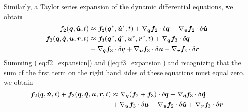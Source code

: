 \documentclass{svjour3}                     %
\begin{document}
Similarly, a Taylor series expansion of the dynamic differential equations, we
obtain
\begin{align}
  \label{eq:f2_expansion}
  \bm{f}_{2}(\bm{q}, \bm{\dot{u}}, t) &\approx
      \bm{f}_{2}(\bm{q}^*, \bm{\dot{u}}^*, t) +
      \nabla_{\bm{q}}\bm{f}_{2} \cdot \delta\bm{q}
      + \nabla_{\bm{\dot{u}}}\bm{f}_{2} \cdot \delta\bm{\dot{u}}\\
  \bm{f}_{3}(\bm{q}, \bm{\dot{q}}, \bm{u}, \bm{r}, t) &\approx
  \bm{f}_{3}(\bm{q}^*, \bm{\dot{q}}^*, \bm{u}^*, \bm{r}^*, t) +
  \nabla_{\bm{q}}\bm{f}_{3} \cdot \delta\bm{q}\notag\\
  \label{eq:f3_expansion}
  &+ \nabla_{\bm{\dot{q}}}\bm{f}_{3} \cdot \delta\bm{\dot{q}}
  + \nabla_{\bm{u}}\bm{f}_{3} \cdot \delta \bm{u}
  + \nabla_{\bm{r}}\bm{f}_{3} \cdot \delta\bm{r}
\end{align}
Summing (\ref{eq:f2_expansion}) and (\ref{eq:f3_expansion}) and recognizing
that the sum of the first term on the right hand sides of these equations must
equal zero, we obtain
\begin{align}
  \bm{f}_{2}(\bm{q}, \bm{\dot{u}}, t) + \bm{f}_{3}(\bm{q}, \bm{\dot{q}},
  \bm{u}, \bm{r}, t) &\approx \nabla_{\bm{q}}(\bm{f}_2 + \bm{f}_3) \cdot
  \delta\bm{q} + \nabla_{\bm{\dot{q}}}\bm{f}_{3} \cdot \delta\bm{\dot{q}}\notag\\
  \label{eq:f2_plus_f3_expansion}
  &+ \nabla_{\bm{u}}\bm{f}_{3} \cdot \delta\bm{u} +
  \nabla_{\bm{\dot{u}}}\bm{f}_{2} \cdot \delta\bm{\dot{u}} + \nabla_{\bm{r}}\bm{f}_{3} \cdot \delta\bm{r}
\end{align}
\end{document}
